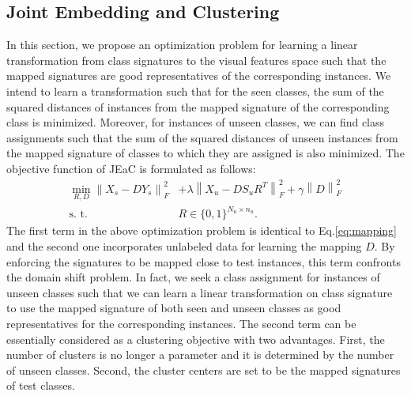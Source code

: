 \documentclass[10pt,twocolumn,letterpaper]{article}
\newcommand{\norm}[1]{\left \lVert #1 \right \rVert_{F}^2}
\DeclareMathOperator*{\minimize}{min}
\begin{document}
\subsection{Joint Embedding and Clustering}
\label{joint}
 In this section, we propose an optimization problem for learning a linear transformation from class signatures to the visual features space such that
 the mapped signatures are good representatives of the corresponding instances.
 We intend to learn a transformation such that for the seen classes, the sum of the squared distances of instances from the
 mapped signature of the corresponding class is minimized. Moreover,
for instances of unseen classes, we can find class assignments such that the sum of the squared distances of unseen instances from the mapped signature
of classes to which they are assigned is also minimized.
 The objective function of JEaC is formulated as follows:
 \begin{align} \label{eq:main}
   \minimize_{R,D} \norm{X_s - D Y_s}  &+ \lambda \norm{X_u - D S_u R^T } + \gamma \norm{D} \\
   \text{s. t.} \quad & R \in \{0,1\}^{N_u \times n_u}. \nonumber
 \end{align}
The first term in the above optimization problem is identical to Eq.\eqref{eq:mapping} and the second one incorporates unlabeled data for learning the mapping $D$. By enforcing
 the signatures to be mapped close to test instances, this term confronts the domain shift problem. In fact, we seek a class assignment for instances of unseen classes such that we can learn a linear transformation on class signature to use the mapped signature of both seen and unseen classes as good representatives for the corresponding instances.
 The second term can be essentially considered as a clustering objective with two advantages. First, the number of clusters is no longer a
 parameter and it is determined by the number of unseen classes. Second, the cluster centers are set to be the mapped signatures of test classes.
\end{document}
